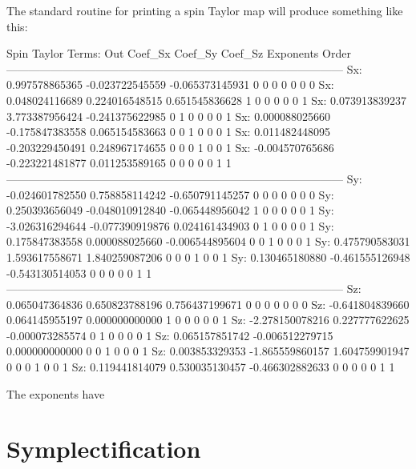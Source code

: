 The standard \bmad routine for printing a spin Taylor map will produce
something like this:
\begin{example}
  Spin Taylor Terms:
  Out      Coef_Sx             Coef_Sy             Coef_Sz         Exponents           Order
  ------------------------------------------------------------------------------------------
  Sx:      0.997578865365     -0.023722545559     -0.065373145931  0  0  0  0  0  0        0
  Sx:      0.048024116689      0.224016548515      0.651545836628  1  0  0  0  0  0        1
  Sx:      0.073913839237      3.773387956424     -0.241375622985  0  1  0  0  0  0        1
  Sx:      0.000088025660     -0.175847383558      0.065154583663  0  0  1  0  0  0        1
  Sx:      0.011482448095     -0.203229450491      0.248967174655  0  0  0  1  0  0        1
  Sx:     -0.004570765686     -0.223221481877      0.011253589165  0  0  0  0  0  1        1
  ------------------------------------------------------------------------------------------
  Sy:     -0.024601782550      0.758858114242     -0.650791145257  0  0  0  0  0  0        0
  Sy:      0.250393656049     -0.048010912840     -0.065448956042  1  0  0  0  0  0        1
  Sy:     -3.026316294644     -0.077390919876      0.024161434903  0  1  0  0  0  0        1
  Sy:      0.175847383558      0.000088025660     -0.006544895604  0  0  1  0  0  0        1
  Sy:      0.475790583031      1.593617558671      1.840259087206  0  0  0  1  0  0        1
  Sy:      0.130465180880     -0.461555126948     -0.543130514053  0  0  0  0  0  1        1
  ------------------------------------------------------------------------------------------
  Sz:      0.065047364836      0.650823788196      0.756437199671  0  0  0  0  0  0        0
  Sz:     -0.641804839660      0.064145955197      0.000000000000  1  0  0  0  0  0        1
  Sz:     -2.278150078216      0.227777622625     -0.000073285574  0  1  0  0  0  0        1
  Sz:      0.065157851742     -0.006512279715      0.000000000000  0  0  1  0  0  0        1
  Sz:      0.003853329353     -1.865559860157      1.604759901947  0  0  0  1  0  0        1
  Sz:      0.119441814079      0.530035130457     -0.466302882633  0  0  0  0  0  1        1
\end{example}
The exponents have 

\section{Symplectification}
\label{s:symp.method}


